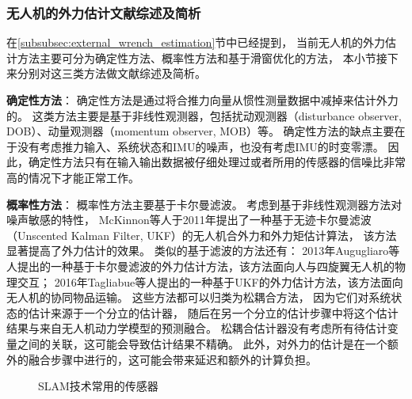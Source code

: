 \subsubsection{无人机的外力估计文献综述及简析}
在\ref{subsubsec:external_wrench_estimation}节中已经提到，
当前无人机的外力估计方法主要可分为确定性方法、概率性方法和基于滑窗优化的方法，
本小节接下来分别对这三类方法做文献综述及简析。

\textbf{确定性方法}：
确定性方法是通过将合推力向量从惯性测量数据中减掉来估计外力的\cite{tomic2014unified}。
这类方法主要是基于非线性观测器，包括扰动观测器（disturbance observer, DOB）\cite{liang2023active, yuksel2014nonlinear}、动量观测器（momentum observer, MOB）\cite{bodie2019omnidirectional,nigro2021control, tomic2016flying,ruggiero2014impedance}等。
确定性方法的缺点主要在于没有考虑推力输入、系统状态和IMU的噪声，也没有考虑IMU的时变零漂。
因此，确定性方法只有在输入输出数据被仔细处理过或者所用的传感器的信噪比非常高的情况下才能正常工作。

\textbf{概率性方法}：
概率性方法主要基于卡尔曼滤波。
考虑到基于非线性观测器方法对噪声敏感的特性，
McKinnon等人于2011年提出了一种基于无迹卡尔曼滤波（Unscented Kalman Filter, UKF）的无人机合外力和外力矩估计算法\cite{mckinnon2016unscented}，
该方法显著提高了外力估计的效果。
类似的基于滤波的方法还有：
2013年Augugliaro等人提出的一种基于卡尔曼滤波的外力估计方法\cite{augugliaro2013admittance}，该方法面向人与四旋翼无人机的物理交互；
2016年Tagliabue等人提出的一种基于UKF的外力估计方法\cite{tagliabue2016collaborative}，该方法面向无人机的协同物品运输。
这些方法都可以归类为松耦合方法，
因为它们对系统状态的估计来源于一个分立的估计器，
随后在另一个分立的估计步骤中将这个估计结果与来自无人机动力学模型的预测融合。
松耦合估计器没有考虑所有待估计变量之间的关联，这可能会导致估计结果不精确。
此外，对外力的估计是在一个额外的融合步骤中进行的，这可能会带来延迟和额外的计算负担。

\begin{figure}[!ht]
    \setlength{\subfigcapskip}{-1bp}
    \centering
    \begin{minipage}{\textwidth}

    \centering
    \subfigure{\label{subfig:vimo_factor_graph}}\addtocounter{subfigure}{-2}
    \subfigure{\label{subfig:vid_fusion_factor_graph}}\addtocounter{subfigure}{-2}

    \end{minipage}
    \caption{SLAM技术常用的传感器}
    \label{fig:common_sensors_for_slam}
\end{figure}

